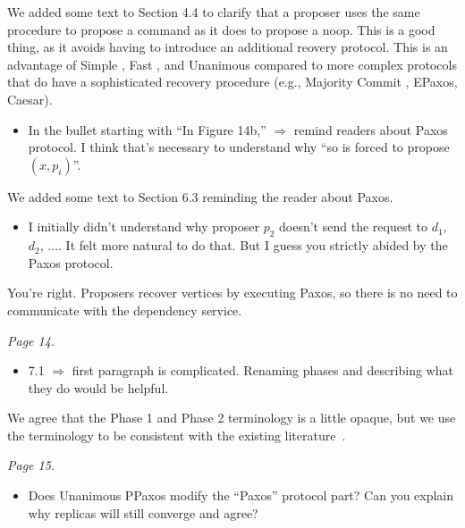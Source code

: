 \documentclass[letterpaper,twocolumn,10pt]{article}
\newenvironment{reviewerquote}
{\list{}{\leftmargin=\parindent\rightmargin=0in}\item[] \itshape \color{ReviewerDarkGray}}%
{\endlist}
\begin{document}
We added some text to Section 4.4 to clarify that a proposer uses the same
procedure to propose a command as it does to propose a noop. This is a good
thing, as it avoids having to introduce an additional reovery protocol. This
is an advantage of Simple \BPaxos{}, Fast \BPaxos{}, and Unanimous \BPaxos{}
compared to more complex protocols that do have a sophisticated recovery
procedure (e.g., Majority Commit \BPaxos{}, EPaxos, Caesar).

\begin{reviewerquote}
  \begin{itemize}
    \item
      In the bullet starting with ``In Figure 14b,'' $\Rightarrow$ remind
      readers about Paxos protocol. I think that's necessary to understand why
      ``so is forced to propose $(x, p_i)$''.
  \end{itemize}
\end{reviewerquote}

We added some text to Section 6.3 reminding the reader about Paxos.

\begin{reviewerquote}
  \begin{itemize}
    \item
      I initially didn't understand why proposer $p_2$ doesn't send the request
      to $d_1$, $d_2$, $\ldots$. It felt more natural to do that. But I guess
      you strictly abided by the Paxos protocol.
  \end{itemize}
\end{reviewerquote}

You're right. Proposers recover vertices by executing Paxos, so there is no
need to communicate with the dependency service.

\begin{reviewerquote}
  Page 14.

  \begin{itemize}
    \item
      7.1 $\Rightarrow$ first paragraph is complicated. Renaming phases and
      describing what they do would be helpful.
  \end{itemize}
\end{reviewerquote}

We agree that the Phase 1 and Phase 2 terminology is a little opaque, but we
use the terminology to be consistent with the existing
literature~\cite{howard2021fast}.

\begin{reviewerquote}
  Page 15.

  \begin{itemize}
    \item
      Does Unanimous PPaxos modify the ``Paxos'' protocol part? Can you explain
      why replicas will still converge and agree?
  \end{itemize}
\end{reviewerquote}
\end{document}

